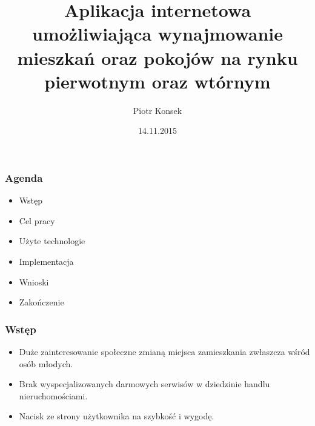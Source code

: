 \documentclass{beamer}
\title[Praca inżynierska]{Aplikacja internetowa umożliwiająca wynajmowanie mieszkań oraz pokojów na rynku pierwotnym oraz wtórnym}
\author[P. Konsek]{Piotr Konsek}
\date[2015]{14.11.2015}
\institute[AGH]
{Informatyka\\ 
Wydział Elektrotechniki Automatyki Informatyki i Inżynierii\\
Biomedycznej
}
\begin{document}
{
 \begin{frame}
   \titlepage
 \end{frame}
}



\begin{frame}
\frametitle{Agenda}
\begin{itemize}
\item Wstęp
\item Cel pracy
\item Użyte technologie
\item Implementacja
\item Wnioski
\item Zakończenie
\end{itemize}

\end{frame}


\begin{frame}
\frametitle{Wstęp}
\begin{itemize}
\item Duże zainteresowanie społeczne zmianą miejsca zamieszkania zwłaszcza wśród osób młodych.
\item Brak wyspecjalizowanych darmowych serwisów w dziedzinie handlu nieruchomościami.
\item Nacisk ze strony użytkownika na szybkość i wygodę.
\end{itemize}

\end{frame}
\end{document}
